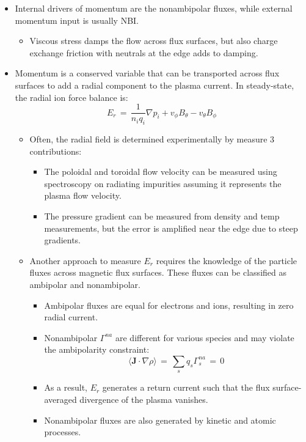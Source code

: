 \documentclass[]{article}
\providecommand{\tightlist}{%
  \setlength{\itemsep}{0pt}\setlength{\parskip}{0pt}}
\begin{document}
\begin{itemize}
\item
  Internal drivers of momentum are the nonambipolar fluxes, while
  external momentum input is usually NBI.

  \begin{itemize}
  \tightlist
  \item
    Viscous stress damps the flow across flux surfaces, but also charge
    exchange friction with neutrals at the edge adds to damping.
  \end{itemize}
\item
  Momentum is a conserved variable that can be transported across flux
  surfaces to add a radial component to the plasma current. In
  steady-state, the radial ion force balance is:
  \[E_r \,=\, \frac{1}{n_i q_i} \nabla p_i + v_\phi B_\theta - v_\theta B_\phi\]

  \begin{itemize}
  \item
    Often, the radial field is determined experimentally by measure 3
    contributions:

    \begin{itemize}
    \item
      The poloidal and toroidal flow velocity can be measured using
      spectroscopy on radiating impurities assuming it represents the
      plasma flow velocity.
    \item
      The pressure gradient can be measured from density and temp
      measurements, but the error is amplified near the edge due to
      steep gradients.
    \end{itemize}
  \item
    Another approach to measure \(E_r\) requires the knowledge of the
    particle fluxes across magnetic flux surfaces. These fluxes can be
    classified as ambipolar and nonambipolar.

    \begin{itemize}
    \item
      Ambipolar fluxes are equal for electrons and ions, resulting in
      zero radial current.
    \item
      Nonambipolar \(\Gamma^{na}\) are different for various species and
      may violate the ambipolarity constraint:
      \[\langle \mathbf{J}\cdot \nabla \rho \rangle \,=\, \sum_s q_s \Gamma_s^{na} \,=\, 0\]
    \item
      As a result, \(E_r\) generates a return current such that the flux
      surface-averaged divergence of the plasma vanishes.
    \item
      Nonambipolar fluxes are also generated by kinetic and atomic
      processes.
    \end{itemize}
  \end{itemize}
\end{itemize}
\end{document}
